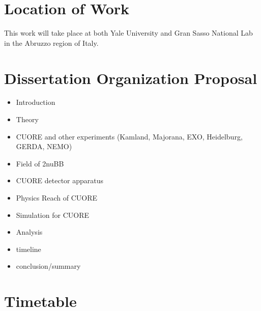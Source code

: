 \documentclass[12pt,a4paper]{article}
\begin{document}
\section{Location of Work}

This work will take place at both Yale University and Gran Sasso National Lab in the Abruzzo region of Italy. 


\section{Dissertation Organization Proposal}

\begin{itemize}
\item Introduction \checkmark
\item Theory \checkmark
\item CUORE and other experiments (Kamland, Majorana, EXO, Heidelburg, GERDA, NEMO)
\item Field of 2nuBB \checkmark 
\item CUORE detector apparatus
\item Physics Reach of CUORE
\item Simulation for CUORE \checkmark
\item Analysis \checkmark
\item timeline
\item conclusion/summary
\end{itemize}

\section{Timetable}

\newpage
\end{document}
